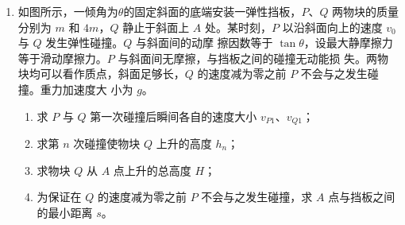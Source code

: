 \begin{enumerate}





\newpage
\item
如图所示，一倾角为$ \theta $的固定斜面的底端安装一弹性挡板，$ P $、$ Q $ 两物块的质量分别为 $ m $ 和
$ 4m $，$ Q $ 静止于斜面上 $ A $ 处。某时刻，$ P $ 以沿斜面向上的速度 $ v_{0} $ 与 $ Q $ 发生弹性碰撞。$ Q $ 与斜面间的动摩
擦因数等于 $ \tan \theta $，设最大静摩擦力等于滑动摩擦力。$ P $ 与斜面间无摩擦，与挡板之间的碰撞无动能损
失。两物块均可以看作质点，斜面足够长，$ Q $ 的速度减为零之前 $ P $ 不会与之发生碰撞。重力加速度大
小为 $ g $。
\begin{enumerate}
\item
求 $ P $ 与 $ Q $ 第一次碰撞后瞬间各自的速度大小 $ v _{P1} $、$ v _{Q1} $；
\item 
求第 $ n $ 次碰撞使物块 $ Q $ 上升的高度 $ h_n $；
\item 
求物块 $ Q $ 从 $ A $ 点上升的总高度 $ H $；
\item 
为保证在 $ Q $ 的速度减为零之前 $ P $ 不会与之发生碰撞，求 $ A $ 点与挡板之间的最小距离 $ s $。
\end{enumerate}
\begin{figure}[h!]
\flushright

\end{figure}






\end{enumerate}

